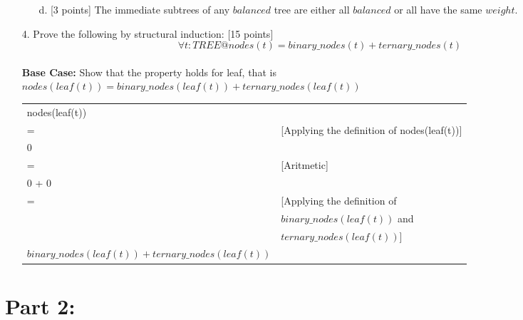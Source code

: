\documentclass[12pt,fleqn]{article}
\begin{document}
\begin{enumerate}
\begin{enumerate}
\vspace{1in} %

\item[d.] [3 points] The immediate subtrees of any $balanced$ tree are either all $balanced$ or all have the same $weight$. 

\vspace{1in} %

\end{enumerate}

\clearpage

\item[4.] Prove the following by structural induction: [15 points]
  $$\forall t:TREE@nodes(t) = binary\_nodes(t) + ternary\_nodes(t)$$ \\
\color{blue}  
\textbf{Base Case:} Show that the property holds for leaf, that is $nodes(leaf(t)) = binary\_nodes(leaf(t)) + ternary\_nodes(leaf(t))$ \\ 

\begin{tabular}{l l}
  nodes(leaf(t)) &  \\
  = & [Applying the definition of nodes(leaf(t))]  \\
  0 & \\
  = & [Aritmetic] \\
  0 + 0 & \\
  = & [Applying the definition of \\
    &  $binary\_nodes(leaf(t))$ and \\
    & $ternary\_nodes(leaf(t))$] \\
  $binary\_nodes(leaf(t)) + ternary\_nodes(leaf(t))$ &  \\
 \end{tabular}


\color{black}
\end{enumerate}

\clearpage

\section*{\sc Part 2:}
\end{document}
